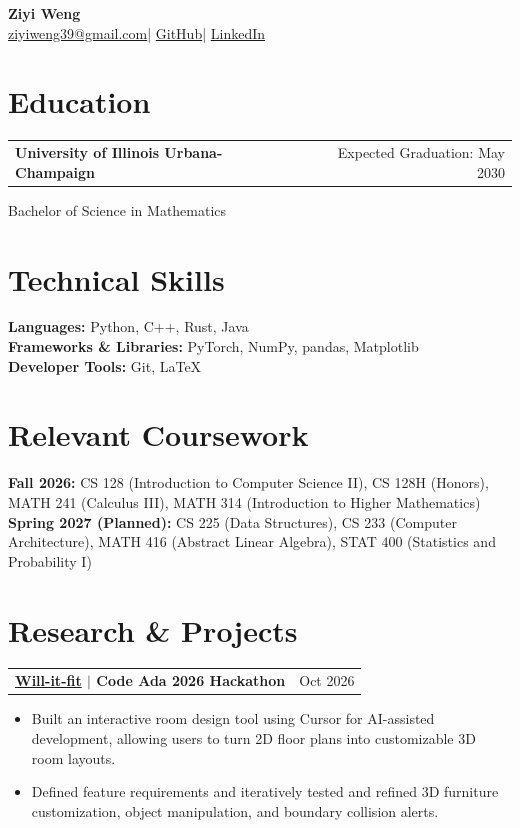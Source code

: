 \documentclass[10pt,letterpaper]{article}
\makeatletter
\newcommand{\entry}[2]{\noindent\begin{tabularx}{\textwidth}{@{}Xr@{}}\textbf{#1} & #2\\\end{tabularx}}
\makeatother
\begin{document}
\begin{center}
{\Large\bfseries Ziyi Weng}\\[4pt]
\href{mailto:ziyiweng39@gmail.com}{ziyiweng39@gmail.com}\quad|\quad
\href{https://github.com/ziyiweng}{GitHub}\quad|\quad
\href{https://www.linkedin.com/in/ziyiweng}{LinkedIn}
\end{center}
\vspace{-6pt}

\section{Education}
\entry{University of Illinois Urbana-Champaign}{Expected Graduation: May 2030}
Bachelor of Science in Mathematics

\section{Technical Skills}
\textbf{Languages:} Python, C++, Rust, Java\\
\textbf{Frameworks \& Libraries:} PyTorch, NumPy, pandas, Matplotlib\\
\textbf{Developer Tools:} Git, LaTeX

\section{Relevant Coursework}
\textbf{Fall 2026:} CS 128 (Introduction to Computer Science II), CS 128H (Honors), MATH 241 (Calculus III), MATH 314 (Introduction to Higher Mathematics)\\
\textbf{Spring 2027 (Planned):} CS 225 (Data Structures), CS 233 (Computer Architecture), MATH 416 (Abstract Linear Algebra), STAT 400 (Statistics and Probability I)

\section{Research \& Projects}
\entry{\href{https://github.com/uiuc-2026-code-ada-team10/will-it-fit}{Will-it-fit} $|$ Code Ada 2026 Hackathon}{Oct 2026}
\begin{itemize}
\item Built an interactive room design tool using Cursor for AI-assisted development, allowing users to turn 2D floor plans into customizable 3D room layouts.
\item Defined feature requirements and iteratively tested and refined 3D furniture customization, object manipulation, and boundary collision alerts.
\end{itemize}
\vspace{7pt}
\end{document}
